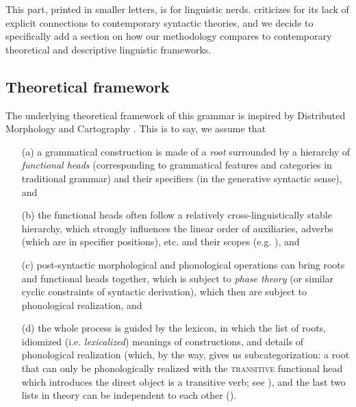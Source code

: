 \documentclass[UTF8, a4paper, oneside, scheme=plain, 12pt]{ctexrep}
\newcommand*{\term}[1]{\emph{#1}}
\newcommand*{\category}[1]{\textsc{#1}}
\begin{document}
{
\small

This part, printed in smaller letters, is for linguistic nerds.
\citet{culicover2004cambridge} criticizes \citet{cgel}
for its lack of explicit connections to contemporary syntactic theories,
and we decide to specifically add a section on how our methodology compares to contemporary
theoretical and descriptive linguistic frameworks.

\subsection{Theoretical framework}\label{sec:theory.framework}

The underlying theoretical framework of this grammar is inspired by Distributed Morphology \citep{siddiqi2009syntax} and Cartography \citep{cinque1999adverbs}.
This is to say, we assume that
\begin{itemize}
    \item[(a)] a grammatical construction is made of a \emph{root} surrounded by a hierarchy of \emph{functional heads} (corresponding to grammatical features and categories in traditional grammar) and their specifiers (in the generative syntactic sense), and 
    \item[(b)] the functional heads often follow a relatively cross-linguistically stable hierarchy,
    which strongly influences the linear order of auxiliaries, adverbs (which are in specifier positions), etc. and their scopes
    (e.g. ), and 
    \item[(c)] post-syntactic morphological and phonological operations can bring roots and functional heads together,
    which is subject to \emph{phase theory} (or similar cyclic constraints of syntactic derivation),
    which then are subject to phonological realization, and 
    \item[(d)] the whole process is guided by the lexicon,
    in which the list of roots, idiomized (i.e. \term{lexicalized}) meanings of constructions,
    and details of phonological realization
    (which, by the way, gives us subcategorization:
    a root that can only be phonologically realized with the \category{transitive} functional head
    which introduces the direct object is a transitive verb; see \citealt{siddiqi2009syntax}),
    and the last two lists in theory can be independent to each other
    ().
\end{itemize}

}
\end{document}
